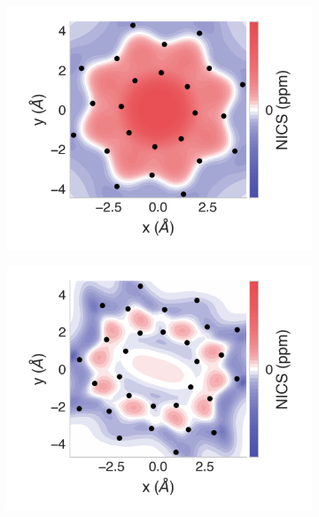 \documentclass[
	fontsize=10pt, %
	twoside=true, %
	numbers=noenddot, %
]{kaobook}
\begin{document}
\begin{figure}[h]
\begin{subfigure}{5.5cm}\centering\includegraphics{as08-2d}\end{subfigure}%
\begin{subfigure}{5.5cm}\centering\includegraphics{as10-2d}\end{subfigure}%

\end{figure}
\end{document}
